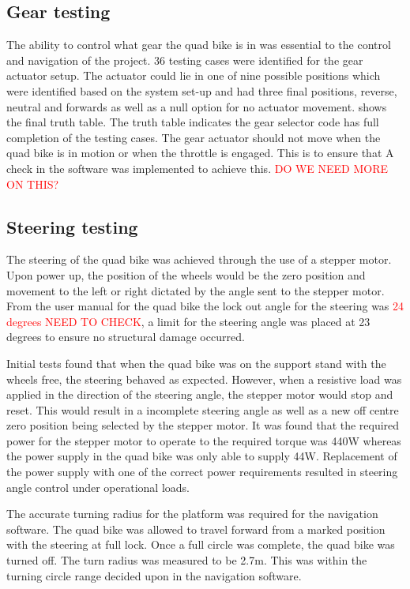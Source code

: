 \documentclass[main.tex]{subfiles}
\begin{document}
\subsection{Gear testing}
The ability to control what gear the quad bike is in was essential to the control and navigation of the project. 36 testing cases were identified for the gear actuator setup. The actuator could lie in one of nine possible positions which were identified based on the system set-up and had three final positions, reverse, neutral and forwards as well as a null option for no actuator movement.  shows the final truth table.
The truth table indicates the gear selector code has full completion of the testing cases. The gear actuator should not move when the quad bike is in motion or when the throttle is engaged. This is to ensure that   A check in the software was implemented to achieve this. \textcolor{red}{DO WE NEED MORE ON THIS?}

\subsection{Steering testing}
The steering of the quad bike was achieved through the use of a stepper motor. Upon power up, the position of the wheels would be the zero position and movement to the left or right dictated by the angle sent to the stepper motor. From the user manual for the quad bike the lock out angle for the steering was \textcolor{red}{24 degrees NEED TO CHECK}, a limit for the steering angle was placed at 23 degrees to ensure no structural damage occurred. 

Initial tests found that when the quad bike was on the support stand with the wheels free, the steering behaved as expected. However, when a resistive load was applied in the direction of the steering angle, the stepper motor would stop and reset. This would result in a incomplete steering angle as well as a new off centre zero position being selected by the stepper motor.  It was found that the required power for the stepper motor to operate to the required torque was 440W whereas the power supply in the quad bike was only able to supply 44W. Replacement of the power supply with one of the correct power requirements resulted in steering angle control under operational loads.

The accurate turning radius for the platform was required for the navigation software. The quad bike was allowed to travel forward from a marked position with the steering at full lock. Once a full circle was complete, the quad bike was turned off. The turn radius was measured to be 2.7m. This was within the turning circle range decided upon in the navigation software.
\end{document}
